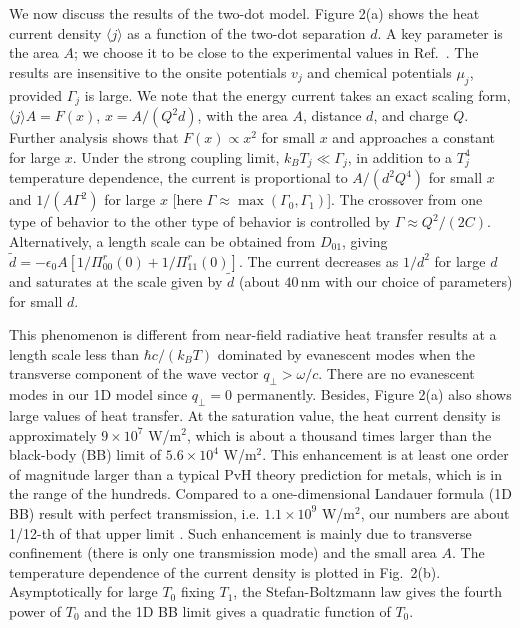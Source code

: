 \documentclass[doublecol]{epl2}
\begin{document}
We now discuss the results of the two-dot model.
Figure 2(a) shows the heat current density $\langle j \rangle$ as a function of the two-dot separation $d$. 
A key parameter is the area $A$; we choose it to be close to the experimental values
in Ref.~\cite{Kloppstech2015}.  The results are insensitive to the onsite potentials $v_j$ and
chemical potentials $\mu_j$, provided $\Gamma_j$ is large.
We note that the energy current takes an exact scaling form, $\langle j \rangle A = F(x)$, $x =A/(Q^2d)$,
with the area $A$, distance $d$, and charge $Q$.  Further analysis shows that $F(x) \propto x^2$ for small
$x$ and approaches a constant for large $x$.   Under the strong coupling limit, $k_B T_j \ll \Gamma_j$, in addition to
a $T_j^4$ temperature dependence, the current is proportional to $A/(d^2 Q^4)$ for small $x$ and 
$1/(A \Gamma^2)$ for large $x$ [here $\Gamma \approx \max( \Gamma_0, \Gamma_1)$].  The crossover from one type of behavior to the other type of behavior
is controlled by 
$\Gamma \approx Q^2/(2C)$.
Alternatively, a length scale can be obtained from $D_{01}$, giving
$\tilde d =  - \epsilon_0 A [1/\Pi^r_{00}(0)+ 1/\Pi^r_{11}(0)]$.   The current decreases as 
$1/d^2$ for large $d$ and saturates at the scale given by $\tilde d$ (about $40\,$nm with our choice of 
parameters) for small $d$.

This phenomenon is different from near-field radiative heat transfer results at a length scale
less than $\hbar c/(k_B T)$ dominated by evanescent modes when the 
transverse component of the wave vector 
$q_\perp > \omega/c$.  There are no 
evanescent modes in our 1D model since
$q_\perp = 0$ permanently. 
Besides, Figure 2(a) also shows large values of heat transfer.
At the saturation value, the heat current density is approximately $9 \times 10^7$ W/m$^2$, which is about a thousand times larger than the black-body (BB) limit of $5.6\times 10^4$ W/m$^2$.    This enhancement 
is at least one order of magnitude larger than a typical PvH theory prediction for metals, which is in the range of the hundreds. 
Compared to a one-dimensional Landauer formula (1D BB) result with perfect transmission, i.e. $1.1\times 10^9$ W/m$^2$, our numbers are about 1/12-th of that upper limit \cite{Abdallah10}. 
Such enhancement is mainly due to transverse confinement (there is
only one transmission mode) and the small area $A$.
The temperature dependence of the current density is plotted in Fig.~2(b). 
Asymptotically for large $T_0$ fixing $T_1$,
the Stefan-Boltzmann law gives the fourth power of $T_0$ and the 1D BB limit gives a quadratic function of $T_0$.  
\end{document}
